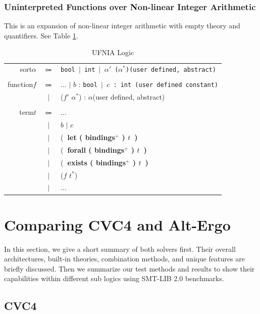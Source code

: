 \documentclass[10pt,letter]{article}
\theoremstyle{definition}
\begin{document}
\subsubsection{Uninterpreted Functions over Non-linear Integer Arithmetic}
This is an expansion of non-linear integer arithmetic with empty theory and quantifiers. See Table \ref{t:ufnialogic}.

\begin{table}[!h]
\begin{mdframed}
\centering
\begin{tabular}{r c l}
sort\qquad $\alpha$ & $\Coloneqq$ & \tt bool $\mid$ int $\mid$ $\alpha'$ \rm ($\alpha^*$)\qquad(user defined, abstract)\\
\\
function\qquad $f$ & $\Coloneqq$ & $\ldots$ $\mid$ \rm $b$ : \tt bool $\mid$ \rm $c$ : \tt int \qquad(\rm user defined constant)\\
& $\mid$ & ($f'$ $\alpha^*$) : $\alpha$\qquad(user defined, abstract)\\
\\
term\qquad $t$ & $\Coloneqq$ & $\ldots$ \\
& $\mid$ & $b$ $\mid$ $c$\\
& $\mid$ & (\bf\ let \rm ( bindings$^+$ ) $t$\ )\\
& $\mid$ & (\bf\ forall \rm ( bindings$^+$ ) $t$\ )\\
& $\mid$ & (\bf\ exists \rm ( bindings$^+$ ) $t$\ )\\
& $\mid$ & ($f$ $t^*$)\\
& $\mid$ & $\ldots$\\
\end{tabular}
\end{mdframed}
\caption{UFNIA Logic}
\label{t:ufnialogic}
\end{table}

\section{Comparing CVC4 and Alt-Ergo}

In this section, we give a short summary of both solvers first. Their overall architectures, built-in theories, combination methods, and unique features are briefly discussed. Then we summarize our test methods and results to show their capabilities within different sub logics using SMT-LIB 2.0 benchmarks.

\subsection{CVC4}
\end{document}
